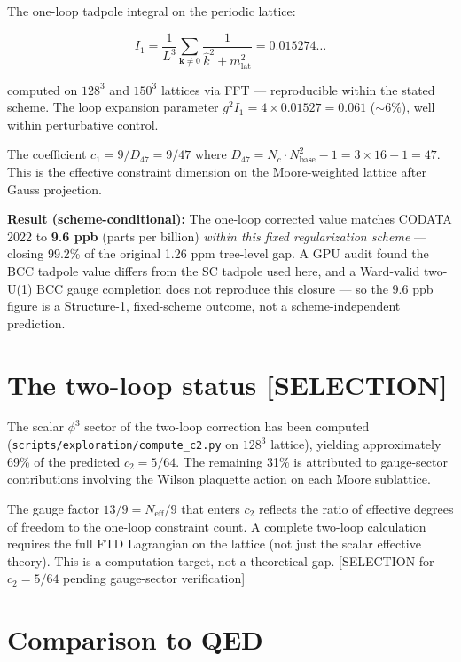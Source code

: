 \documentclass[
  11pt,
  letterpaper,
  twoside,
  openany]{book}
\makeatletter
\let\orig@section\section
\renewcommand{\section}{\needspace{8\baselineskip}\orig@section}
\makeatother
\begin{document}
The one-loop tadpole integral on the periodic lattice:

\[
I_1 = \frac{1}{L^3} \sum_{\mathbf{k} \neq 0} \frac{1}{\hat{k}^2 + m^2_{\text{lat}}} = 0.015274\ldots
\tag{11.3}
\]

computed on \(128^3\) and \(150^3\) lattices via FFT --- reproducible
within the stated scheme. The loop expansion parameter
\(g^2 I_1 = 4 \times 0.01527 = 0.061\) (\(\sim 6\%\)), well within
perturbative control.

The coefficient \(c_1 = 9/D_{47} = 9/47\) where
\(D_{47} = N_c \cdot N_{\text{base}}^2 - 1 = 3 \times 16 - 1 = 47\).
This is the effective constraint dimension on the Moore-weighted lattice
after Gauss projection.

\textbf{Result (scheme-conditional):} The one-loop corrected value
matches CODATA 2022 to \textbf{9.6 ppb} (parts per billion) \emph{within
this fixed regularization scheme} --- closing 99.2\% of the original
1.26 ppm tree-level gap. A GPU audit found the BCC tadpole value differs
from the SC tadpole used here, and a Ward-valid two-U(1) BCC gauge
completion does not reproduce this closure --- so the 9.6 ppb figure is
a Structure-1, fixed-scheme outcome, not a scheme-independent
prediction.

\section{The two-loop status
{[}SELECTION{]}}\label{the-two-loop-status-selection}

The scalar \(\phi^3\) sector of the two-loop correction has been
computed (\texttt{scripts/exploration/compute\_c2.py} on \(128^3\)
lattice), yielding approximately 69\% of the predicted \(c_2 = 5/64\).
The remaining 31\% is attributed to gauge-sector contributions involving
the Wilson plaquette action on each Moore sublattice.

The gauge factor \(13/9 = N_{\text{eff}}/9\) that enters \(c_2\)
reflects the ratio of effective degrees of freedom to the one-loop
constraint count. A complete two-loop calculation requires the full FTD
Lagrangian on the lattice (not just the scalar effective theory). This
is a computation target, not a theoretical gap. {[}SELECTION for
\(c_2 = 5/64\) pending gauge-sector verification{]}

\section{Comparison to QED}\label{comparison-to-qed}
\end{document}
